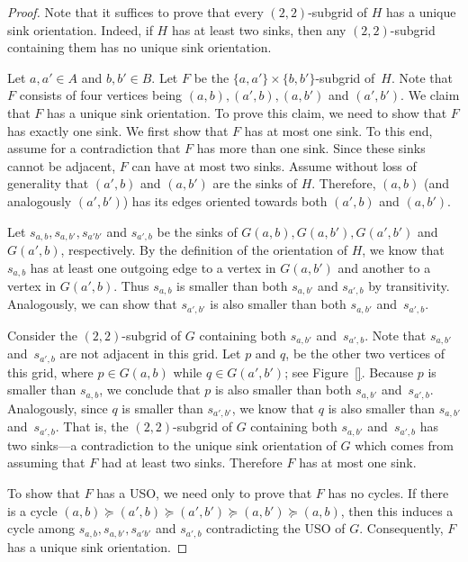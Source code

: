 \documentclass[a4paper,10pt]{article}
\begin{document}
\begin{proof}
Note that it suffices to prove that every $(2,2)$-subgrid of $H$ has a unique sink orientation. Indeed, if $H$ has at least two sinks, then any $(2,2)$-subgrid containing them has no unique sink orientation.

Let $a, a'\in A$ and $b,b'\in B$. Let $F$ be the $\{a,a'\}\times\{b, b'\}$-subgrid of~$H$.
Note that $F$ consists of four vertices being $(a,b), (a', b), (a, b')$ and $(a', b')$.
We claim that $F$ has a unique sink orientation. 
To prove this claim, we need to show that $F$ has exactly one sink.
We first show that $F$ has at most one sink.
To this end, assume for a contradiction that $F$ has more than one sink.
Since these sinks cannot be adjacent, $F$ can have at most two sinks.
Assume without loss of generality that $(a',b)$ and $(a, b')$ are the sinks of $H$.
Therefore, $(a, b)$ (and analogously $(a', b')$) has its edges oriented towards both $(a',b)$ and $(a, b')$.

Let $s_{a,b}, s_{a, b'}, s_{a'b'}$ and $s_{a', b}$ be the sinks of $G(a,b), G(a,b'), G(a',b')$ and $G(a',b)$, respectively.
By the definition of the orientation of $H$, we know that $s_{a,b}$ has at least one outgoing edge to a vertex in $G(a, b')$ and another to a vertex in $G(a', b)$. Thus $s_{a,b}$ is smaller than both $s_{a,b'}$ and $s_{a',b}$ by transitivity. Analogously, we can show that $s_{a',b'}$ is also smaller than both $s_{a,b'}$ and~$s_{a',b}$. 

Consider the $(2,2)$-subgrid of $G$ containing both $s_{a,b'}$ and~$s_{a',b}$. Note that $s_{a,b'}$ and~$s_{a',b}$ are not adjacent in this grid. Let $p$ and $q$, be the other two vertices of this grid, where $p\in G(a, b)$ while $q\in G(a', b')$; see Figure~\ref{}.
Because $p$ is smaller than $s_{a, b}$, we conclude that $p$ is also smaller than both $s_{a,b'}$ and~$s_{a',b}$. Analogously, since $q$ is smaller than $s_{a',b'}$, we know that $q$ is also smaller than $s_{a,b'}$ and~$s_{a',b}$. That is, the $(2,2)$-subgrid of $G$ containing both $s_{a,b'}$ and~$s_{a',b}$ has two sinks---a contradiction to the unique sink orientation of $G$ which comes from assuming that $F$ had at least two sinks.
Therefore $F$ has at most one sink.

To show that $F$ has a USO, we need only to prove that $F$ has no cycles.
If there is a cycle $(a,b)\succeq (a', b) \succeq (a', b') \succeq (a, b') \succeq (a,b)$, then
this induces a cycle among $s_{a,b}, s_{a, b'}, s_{a'b'}$ and $s_{a', b}$ contradicting the USO of $G$. Consequently, $F$ has a unique sink orientation.
\end{proof}
\end{document}
